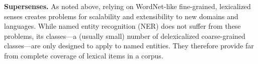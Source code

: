 \documentclass[11pt,letterpaper]{article}
\newcommand{\ensuretext}[1]{#1}
\newcommand{\nssmarker}{\ensuretext{\textcolor{magenta}{\ensuremath{^{\textsc{NS}}_{\textsc{S}}}}}}
\newcommand{\arkcomment}[3]{\ensuretext{\textcolor{#3}{[#1 #2]}}}
\newcommand{\nss}[1]{\arkcomment{\nssmarker}{#1}{magenta}}
\newcommand{\longversion}[1]{#1} %
\begin{document}
\textbf{Supersenses.}
% 
As noted above, relying on WordNet-like fine-grained, lexicalized senses 
creates problems for scalability and extensibility to new domains and languages. 
While named entity recognition (NER) does not suffer from these problems, its classes---a (usually small) number of delexicalized coarse-grained classes---are only designed to apply to named entities.
They therefore provide far from complete coverage of lexical items in a corpus.
\end{document}
